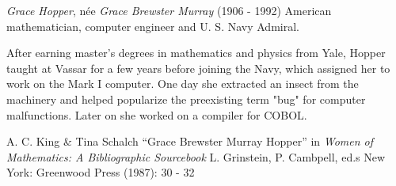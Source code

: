 \documentclass[12pt]{article}
\begin{document}

\emph{Grace Hopper}, n\'ee {\em Grace Brewster Murray} (1906 - 1992) American mathematician, computer engineer and U. S. Navy Admiral.

After earning master's degrees in mathematics and physics from Yale, Hopper taught at Vassar  for a few years before joining the Navy, which assigned her to work on the Mark I computer. One day she extracted an insect from the machinery and helped popularize the preexisting term "bug" for computer malfunctions. Later on she worked on a compiler for COBOL.

\begin{thebibliography}{1}
 A. C. King \& Tina Schalch ``Grace Brewster Murray Hopper'' in {\it Women of Mathematics: A Bibliographic Sourcebook} L. Grinstein, P. Cambpell, ed.s New York: Greenwood Press (1987): 30 - 32
\end{thebibliography}
\end{document}
